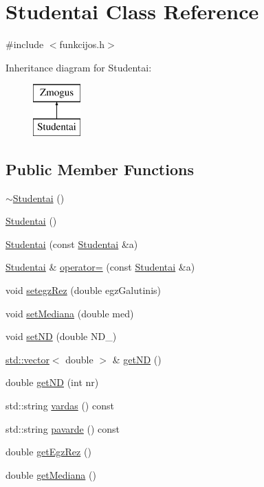 \hypertarget{class_studentai}{}\section{Studentai Class Reference}
\label{class_studentai}


{\ttfamily \#include $<$funkcijos.\+h$>$}

Inheritance diagram for Studentai\+:\begin{figure}[H]
\begin{center}
\leavevmode
\includegraphics[height=2.000000cm]{class_studentai}
\end{center}
\end{figure}
\subsection*{Public Member Functions}
\begin{DoxyCompactItemize}
\item 
\mbox{\hyperlink{class_studentai_a10895815f551906aae4c2823bfd1bbc5}{$\sim$\+Studentai}} ()
\item 
\mbox{\hyperlink{class_studentai_a8f53d55bca475d5bf1973f4f3c53f047}{Studentai}} ()
\item 
\mbox{\hyperlink{class_studentai_a0c7d19b397626f33dc2e127d7c41c445}{Studentai}} (const \mbox{\hyperlink{class_studentai}{Studentai}} \&a)
\item 
\mbox{\hyperlink{class_studentai}{Studentai}} \& \mbox{\hyperlink{class_studentai_a5b971c5bfd9e3ec4ba7cd7aa1ab31db5}{operator=}} (const \mbox{\hyperlink{class_studentai}{Studentai}} \&a)
\item 
void \mbox{\hyperlink{class_studentai_ad4979b0c6137e0ce9edad1d609bed522}{setegz\+Rez}} (double egz\+Galutinis)
\item 
void \mbox{\hyperlink{class_studentai_a54ec3efbba483b0184c0fe3eafe40b67}{set\+Mediana}} (double med)
\item 
void \mbox{\hyperlink{class_studentai_af044b7fd795d8df0bf899ca91c82f32d}{set\+ND}} (double N\+D\+\_\+)
\item 
\mbox{\hyperlink{vector_8cpp_a428a4ddfbed4c2db0ef58ecfffdccf8d}{std\+::vector}}$<$ double $>$ \& \mbox{\hyperlink{class_studentai_af78d09bf07faaf71bd442559b751068d}{get\+ND}} ()
\item 
double \mbox{\hyperlink{class_studentai_a3bc596569b26bf9673c772f844fbc756}{get\+ND}} (int nr)
\item 
std\+::string \mbox{\hyperlink{class_studentai_a9c1d7911e85eac3b260a27dba06067dd}{vardas}} () const
\item 
std\+::string \mbox{\hyperlink{class_studentai_af77caf5768840f5660954fbe64745efa}{pavarde}} () const
\item 
double \mbox{\hyperlink{class_studentai_a9f8cc8dd7f888c7a8d9fb2db070195d6}{get\+Egz\+Rez}} ()
\item 
double \mbox{\hyperlink{class_studentai_a84ac1c18fb51c7c486df8a1f7360c156}{get\+Mediana}} ()
\end{DoxyCompactItemize}
